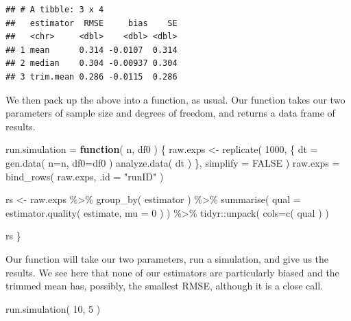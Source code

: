 \documentclass[
]{book}
\newenvironment{Shaded}{\begin{snugshade}}{\end{snugshade}}
\newcommand{\AttributeTok}[1]{\textcolor[rgb]{0.77,0.63,0.00}{#1}}
\newcommand{\ConstantTok}[1]{\textcolor[rgb]{0.00,0.00,0.00}{#1}}
\newcommand{\ControlFlowTok}[1]{\textcolor[rgb]{0.13,0.29,0.53}{\textbf{#1}}}
\newcommand{\DecValTok}[1]{\textcolor[rgb]{0.00,0.00,0.81}{#1}}
\newcommand{\FunctionTok}[1]{\textcolor[rgb]{0.00,0.00,0.00}{#1}}
\newcommand{\NormalTok}[1]{#1}
\newcommand{\OtherTok}[1]{\textcolor[rgb]{0.56,0.35,0.01}{#1}}
\newcommand{\SpecialCharTok}[1]{\textcolor[rgb]{0.00,0.00,0.00}{#1}}
\newcommand{\StringTok}[1]{\textcolor[rgb]{0.31,0.60,0.02}{#1}}
\begin{document}
\begin{verbatim}
## # A tibble: 3 x 4
##   estimator  RMSE     bias    SE
##   <chr>     <dbl>    <dbl> <dbl>
## 1 mean      0.314 -0.0107  0.314
## 2 median    0.304 -0.00937 0.304
## 3 trim.mean 0.286 -0.0115  0.286
\end{verbatim}

We then pack up the above into a function, as usual.
Our function takes our two parameters of sample size and degrees of freedom, and returns a data frame of results.

\begin{Shaded}
\begin{Highlighting}[]
\NormalTok{run.simulation }\OtherTok{=} \ControlFlowTok{function}\NormalTok{( n, df0 ) \{}
\NormalTok{    raw.exps }\OtherTok{\textless{}{-}} \FunctionTok{replicate}\NormalTok{( }\DecValTok{1000}\NormalTok{, \{}
\NormalTok{        dt }\OtherTok{=} \FunctionTok{gen.data}\NormalTok{( }\AttributeTok{n=}\NormalTok{n, }\AttributeTok{df0=}\NormalTok{df0 )}
        \FunctionTok{analyze.data}\NormalTok{( dt )}
\NormalTok{    \}, }\AttributeTok{simplify =} \ConstantTok{FALSE}\NormalTok{ )}
\NormalTok{    raw.exps }\OtherTok{=} \FunctionTok{bind\_rows}\NormalTok{( raw.exps, }\AttributeTok{.id =} \StringTok{"runID"}\NormalTok{ )}

\NormalTok{    rs }\OtherTok{\textless{}{-}}\NormalTok{ raw.exps }\SpecialCharTok{\%\textgreater{}\%}
        \FunctionTok{group\_by}\NormalTok{( estimator ) }\SpecialCharTok{\%\textgreater{}\%}
        \FunctionTok{summarise}\NormalTok{( }\AttributeTok{qual =} \FunctionTok{estimator.quality}\NormalTok{( estimate, }\AttributeTok{mu =} \DecValTok{0}\NormalTok{ ) ) }\SpecialCharTok{\%\textgreater{}\%}
\NormalTok{        tidyr}\SpecialCharTok{::}\FunctionTok{unpack}\NormalTok{( }\AttributeTok{cols=}\FunctionTok{c}\NormalTok{( qual ) )}

\NormalTok{    rs}
\NormalTok{\}}
\end{Highlighting}
\end{Shaded}

Our function will take our two parameters, run a simulation, and give us the
results. We see here that none of our estimators are particularly biased and
the trimmed mean has, possibly, the smallest RMSE, although it is a close
call.

\begin{Shaded}
\begin{Highlighting}[]
\FunctionTok{run.simulation}\NormalTok{( }\DecValTok{10}\NormalTok{, }\DecValTok{5}\NormalTok{ )}
\end{Highlighting}
\end{Shaded}
\end{document}
